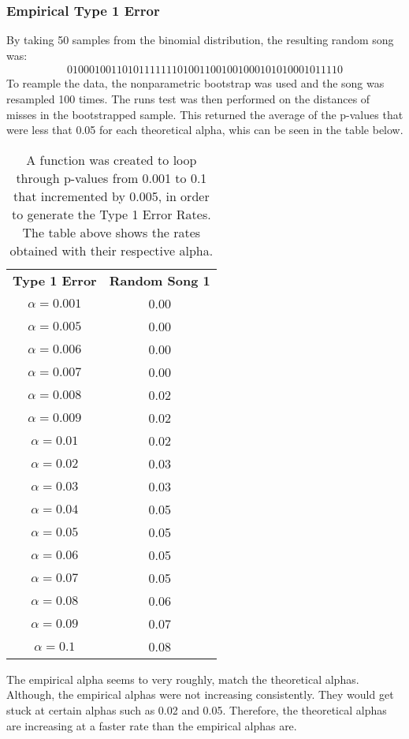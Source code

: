 \documentclass[12pt, letterpaper]{article}
\begin{document}
\subsubsection{Empirical Type 1 Error} 
By taking 50 samples from the binomial distribution, the resulting random song was:
\begin{gather*}
  0 1 0 0 0 1 0 0 1 1 0 1 0 1 1 1 1 1 1 1 0 
  1 0 0 1 1 0 0 1 0 0 1 0 0 0 1 0 1 0 1 0 0
  0 1 0 1 1 1 1 0
\end{gather*} 
To reample the data, the nonparametric bootstrap was used and the song was resampled 100 times. The runs test was then performed on the distances of misses in the bootstrapped sample. This returned the average of the p-values that were less that 0.05 for each theoretical alpha, whis can be seen in the table below.
\begin{table}[t]
\begin{center}
\begin{tabular}{|c|c|}
\textbf{Type 1 Error} & \textbf{Random Song 1}\\
$\alpha = 0.001$ & 0.00\\
$\alpha = 0.005$ &  0.00\\
$\alpha = 0.006$ &  0.00\\
$\alpha = 0.007$ & 0.00\\
$\alpha = 0.008$ & 0.02\\
$\alpha = 0.009$ & 0.02\\
$\alpha = 0.01$ & 0.02\\
$\alpha = 0.02$ & 0.03\\
$\alpha = 0.03$ & 0.03\\
$\alpha = 0.04$ & 0.05\\
$\alpha = 0.05$ &  0.05\\
$\alpha = 0.06$ &  0.05\\
$\alpha = 0.07$ &  0.05\\
$\alpha = 0.08$ &  0.06\\
$\alpha = 0.09$ & 0.07\\
$\alpha = 0.1$ & 0.08 \\ 
\end{tabular}
\end{center}
\caption{A function was created to loop through p-values from 0.001 to 0.1 that incremented by 0.005, in order to  generate the Type 1 Error Rates. The table above shows the rates obtained with their respective alpha.}
\label{fig: Type 1 Error Rates for Nonparametric Bootstrap}
\end{table}
The empirical alpha seems to very roughly, match the theoretical alphas. Although, the empirical alphas were not increasing consistently. They would get stuck at certain alphas such as 0.02 and 0.05. Therefore, the theoretical alphas are increasing at a faster rate than the empirical alphas are.
\end{document}
